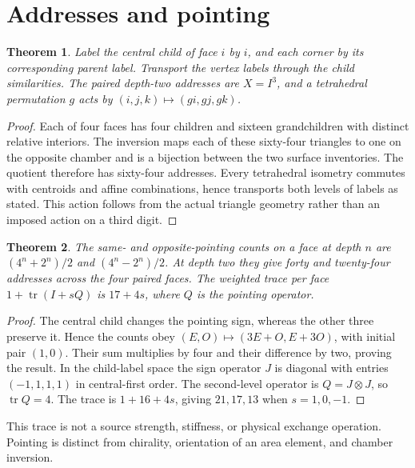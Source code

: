 \documentclass[10pt,a4paper,twocolumn]{article}
\newtheorem{theorem}{Theorem}
\newcommand{\tr}{\operatorname{tr}}
\begin{document}
\section*{Addresses and pointing}
\begin{theorem}
Label the central child of face $i$ by $i$, and each corner by its corresponding parent label. Transport the vertex labels through the child similarities. The paired depth-two addresses are $X=I^3$, and a tetrahedral permutation $g$ acts by $(i,j,k)\mapsto(g i,g j,g k)$.
\end{theorem}
\begin{proof}
Each of four faces has four children and sixteen grandchildren with distinct relative interiors. The inversion maps each of these sixty-four triangles to one on the opposite chamber and is a bijection between the two surface inventories. The quotient therefore has sixty-four addresses. Every tetrahedral isometry commutes with centroids and affine combinations, hence transports both levels of labels as stated. This action follows from the actual triangle geometry rather than an imposed action on a third digit.
\end{proof}
\begin{theorem}
The same- and opposite-pointing counts on a face at depth $n$ are $(4^n+2^n)/2$ and $(4^n-2^n)/2$. At depth two they give forty and twenty-four addresses across the four paired faces. The weighted trace per face $1+\tr(I+sQ)$ is $17+4s$, where $Q$ is the pointing operator.
\end{theorem}
\begin{proof}
The central child changes the pointing sign, whereas the other three preserve it. Hence the counts obey $(E,O)\mapsto(3E+O,E+3O)$, with initial pair $(1,0)$. Their sum multiplies by four and their difference by two, proving the result. In the child-label space the sign operator $J$ is diagonal with entries $(-1,1,1,1)$ in central-first order. The second-level operator is $Q=J\otimes J$, so $\tr Q=4$. The trace is $1+16+4s$, giving $21,17,13$ when $s=1,0,-1$.
\end{proof}
This trace is not a source strength, stiffness, or physical exchange operation. Pointing is distinct from chirality, orientation of an area element, and chamber inversion.
\end{document}
